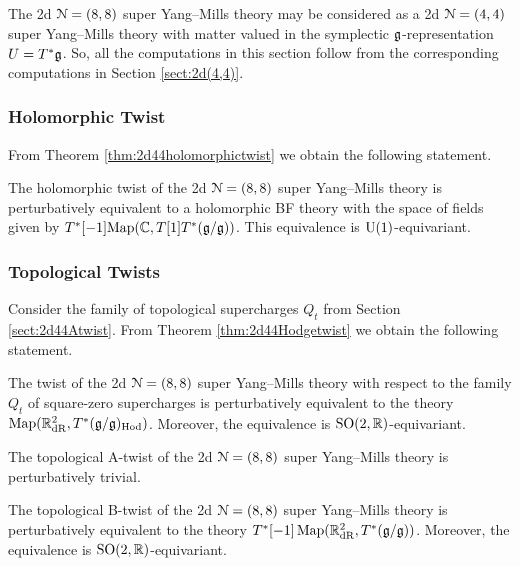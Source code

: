 \documentclass[10pt, oneside]{article}
\begin{document}
The 2d $\mathcal N=(8, 8)$ super Yang--Mills theory may be considered as a 2d $\mathcal N=(4, 4)$ super Yang--Mills theory with matter valued in the symplectic $\mathfrak g$-representation $U=T^*\mathfrak g$. So, all the computations in this section follow from the corresponding computations in Section \ref{sect:2d(4,4)}.

\subsubsection{Holomorphic Twist} \label{sect:2d88minimaltwist}

From Theorem \ref{thm:2d44holomorphictwist} we obtain the following statement.

\begin{theorem}
The holomorphic twist of the 2d $\mathcal{N}=(8,8)$ super Yang--Mills theory is perturbatively equivalent to a holomorphic BF theory with the space of fields given by $T^*[-1]\mathrm{Map}(\mathbb C, T[1] T^*(\mathfrak g/\mathfrak g))$. This equivalence is $\mathrm{U}(1)$-equivariant.
\end{theorem}

\subsubsection{Topological Twists}
\label{sect:2d88Atwist}
\label{sect:2d88Btwist}

Consider the family of topological supercharges $Q_t$ from Section \ref{sect:2d44Atwist}. From Theorem \ref{thm:2d44Hodgetwist} we obtain the following statement.

\begin{theorem}
The twist of the 2d $\mathcal N=(8, 8)$ super Yang--Mills theory with respect to the family $Q_t$ of square-zero supercharges is perturbatively equivalent to the theory $\operatorname{Map}(\mathbb R^2_{\mathrm{dR}}, T^*(\mathfrak g/\mathfrak g)_{\mathrm{Hod}})$. Moreover, the equivalence is $\mathrm{SO}(2, \mathbb R)$-equivariant.
\label{thm:2d88Hodgetwist}
\end{theorem}

\begin{corollary}
The topological A-twist of the 2d $\mathcal N=(8, 8)$ super Yang--Mills theory is perturbatively trivial.
\label{cor:2d88Atwist}
\end{corollary}

\begin{corollary}
The topological B-twist of the 2d $\mathcal N=(8, 8)$ super Yang--Mills theory is perturbatively equivalent to the theory $T^*[-1]\operatorname{Map}(\mathbb R^2_{\mathrm{dR}}, T^*(\mathfrak g/\mathfrak g))$. Moreover, the equivalence is $\mathrm{SO}(2, \mathbb R)$-equivariant.
\label{cor:2d88Btwist}
\end{corollary}
\end{document}
